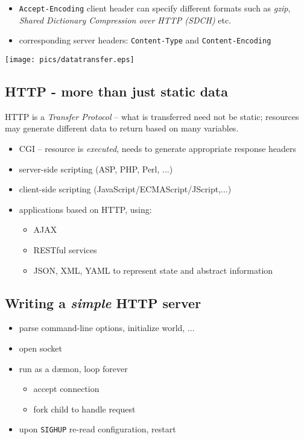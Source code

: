 \documentclass[xga]{xdvislides}
\begin{document}
\begin{itemize}
	\item {\tt Accept-Encoding} client header can specify different formats
		such as {\em gzip}, {\em Shared Dictionary Compression over HTTP (SDCH)} etc.
	\item corresponding server headers: {\tt Content-Type} and
		{\tt Content-Encoding}
\end{itemize}
\begin{center}
	\texttt{[image: pics/datatransfer.eps]}
\end{center}

\subsection{HTTP - more than just static data}
HTTP is a {\em Transfer Protocol} -- what is transferred need not be
static; resources may generate different data to return based on many
variables.

\begin{itemize}
	\item CGI -- resource is {\em executed}, needs to generate
		appropriate response headers
	\item server-side scripting (ASP, PHP, Perl, ...)
	\item client-side scripting (JavaScript/ECMAScript/JScript,...)
	\item applications based on HTTP, using:
		\begin{itemize}
			\item AJAX
			\item RESTful services
			\item JSON, XML, YAML to represent state and
				abstract information
		\end{itemize}
\end{itemize}

\subsection{Writing a {\em simple} HTTP server}
\begin{itemize}
	\item parse command-line options, initialize world, ...
	\item open socket
	\item run as a d\ae mon, loop forever
		\begin{itemize}
			\item accept connection
			\item fork child to handle request
		\end{itemize}
	\item upon {\tt SIGHUP} re-read configuration, restart
\end{itemize}
\end{document}
